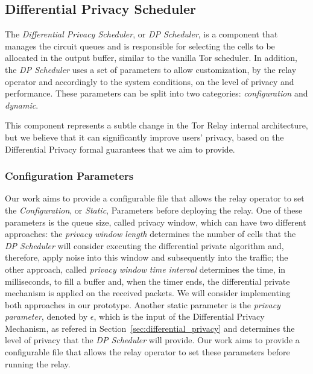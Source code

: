 \subsection{Differential Privacy Scheduler}\label{subsec:differential_privacy_approach}

The \textit{Differential Privacy Scheduler}, or \textit{DP Scheduler}, is a component that manages the circuit queues and is responsible for selecting the cells to be allocated in the output buffer, similar to the vanilla Tor scheduler. In addition, the \textit{DP Scheduler} uses a set of parameters to allow customization, by the relay operator and accordingly to the system conditions, on the level of privacy and performance. These parameters can be split into two categories: \textit{configuration} and \textit{dynamic}. 

This component represents a subtle change in the Tor Relay internal architecture, but we believe that it can significantly improve users' privacy, based on the Differential Privacy formal guarantees that we aim to provide.

\subsubsection{Configuration Parameters}\label{subsubsec:configuration_parameters}

Our work aims to provide a configurable file that allows the relay operator to set the \textit{Configuration}, or \textit{Static}, Parameters before deploying the relay.
One of these parameters is the queue size, called privacy window, which can have two different approaches: the \textit{privacy window length} determines the number of cells that the \textit{DP Scheduler} will consider executing the differential private algorithm and, therefore, apply noise into this window and subsequently into the traffic; the other approach, called \textit{privacy window time interval} determines the time, in milliseconds, to fill a buffer and, when the timer ends, the differential private mechanism is applied on the received packets. We will consider implementing both approaches in our prototype. 
Another static parameter is the \textit{privacy parameter}, denoted by $\epsilon$, which is the input of the Differential Privacy Mechanism, as refered in Section~\ref{sec:differential_privacy} and determines the level of privacy that the \textit{DP Scheduler} will provide. Our work aims to provide a configurable file that allows the relay operator to set these parameters before running the relay.

